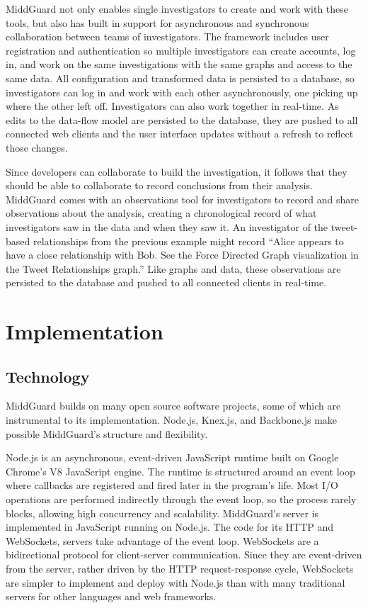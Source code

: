 \documentclass[midd]{thesis}
\begin{document}
MiddGuard not only enables single investigators to create and work with these
tools, but also has built in support for asynchronous and synchronous
collaboration between teams of investigators. The framework includes user
registration and authentication so multiple investigators can create accounts,
log in, and work on the same investigations with the same graphs and access to
the same data. All configuration and transformed data is persisted to a
database, so investigators can log in and work with each other asynchronously,
one picking up where the other left off. Investigators can also work together in
real-time. As edits to the data-flow model are persisted to the database, they
are pushed to all connected web clients and the user interface updates without a
refresh to reflect those changes.

Since developers can collaborate to build the investigation, it follows that
they should be able to collaborate to record conclusions from their analysis.
MiddGuard comes with an observations tool for investigators to record and share
observations about the analysis, creating a chronological record of what
investigators saw in the data and when they saw it. An investigator of the
tweet-based relationships from the previous example might record ``Alice appears
to have a close relationship with Bob. See the Force Directed Graph
visualization in the Tweet Relationships graph.'' Like graphs and data, these
observations are persisted to the database and pushed to all connected clients
in real-time.

\chapter{Implementation}

\section{Technology}

MiddGuard builds on many open source software projects, some of which are
instrumental to its implementation. Node.js, Knex.js, and Backbone.js make
possible MiddGuard's structure and flexibility.

Node.js \cite{nodejs} is an asynchronous, event-driven JavaScript runtime built
on Google Chrome's V8 JavaScript engine. The runtime is structured around an
event loop where callbacks are registered and fired later in the program's life.
Most I/O operations are performed indirectly through the event loop, so the
process rarely blocks, allowing high concurrency and scalability. MiddGuard's
server is implemented in JavaScript running on Node.js. The code for its HTTP
and WebSockets, servers take advantage of the event loop. WebSockets are a
bidirectional protocol for client-server communication. Since they are
event-driven from the server, rather driven by the HTTP request-response cycle,
WebSockets are simpler to implement and deploy with Node.js than with many
traditional servers for other languages and web frameworks.
\end{document}
